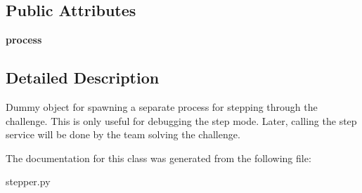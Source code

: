 \subsection*{Public Attributes}
\begin{DoxyCompactItemize}
\item 
{\bfseries process}\hypertarget{classstepper_1_1Stepper_a66d8fe911e06db3ea2e2b0ff7d423291}{}\label{classstepper_1_1Stepper_a66d8fe911e06db3ea2e2b0ff7d423291}

\end{DoxyCompactItemize}


\subsection{Detailed Description}
\begin{DoxyVerb}Dummy object for spawning a separate process for stepping through the challenge.
This is only useful for debugging the step mode. Later, calling the step
service will be done by the team solving the challenge.
\end{DoxyVerb}
 

The documentation for this class was generated from the following file\+:\begin{DoxyCompactItemize}
\item 
stepper.\+py\end{DoxyCompactItemize}
